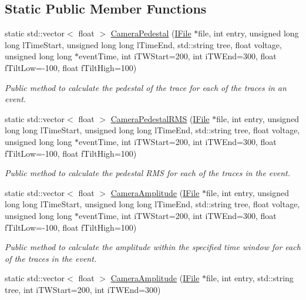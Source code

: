 \subsection*{Static Public Member Functions}
\begin{DoxyCompactItemize}
\item 
static std\+::vector$<$ float $>$ \hyperlink{classIHealthTools_aa6bdf03f0f7595eec0a894c7c73134ea}{Camera\+Pedestal} (\hyperlink{classIFile}{I\+File} $\ast$file, int entry, unsigned long long l\+Time\+Start, unsigned long long l\+Time\+End, std\+::string tree, float voltage, unsigned long long $\ast$event\+Time, int i\+T\+W\+Start=200, int i\+T\+W\+End=300, float f\+Tilt\+Low=-\/100, float f\+Tilt\+High=100)
\begin{DoxyCompactList}\small\item\em Public method to calculate the pedestal of the trace for each of the traces in an event. \end{DoxyCompactList}\item 
static std\+::vector$<$ float $>$ \hyperlink{classIHealthTools_a6adf7b141d8cf397ec7f6abdbd81befd}{Camera\+Pedestal\+R\+MS} (\hyperlink{classIFile}{I\+File} $\ast$file, int entry, unsigned long long l\+Time\+Start, unsigned long long l\+Time\+End, std\+::string tree, float voltage, unsigned long long $\ast$event\+Time, int i\+T\+W\+Start=200, int i\+T\+W\+End=300, float f\+Tilt\+Low=-\/100, float f\+Tilt\+High=100)
\begin{DoxyCompactList}\small\item\em Public method to calculate the pedestal R\+MS for each of the traces in the event. \end{DoxyCompactList}\item 
static std\+::vector$<$ float $>$ \hyperlink{classIHealthTools_a93e06807e441043c9597391754537dc4}{Camera\+Amplitude} (\hyperlink{classIFile}{I\+File} $\ast$file, int entry, unsigned long long l\+Time\+Start, unsigned long long l\+Time\+End, std\+::string tree, float voltage, unsigned long long $\ast$event\+Time, int i\+T\+W\+Start=200, int i\+T\+W\+End=300, float f\+Tilt\+Low=-\/100, float f\+Tilt\+High=100)
\begin{DoxyCompactList}\small\item\em Public method to calculate the amplitude within the specified time window for each of the traces in the event. \end{DoxyCompactList}\item 
static std\+::vector$<$ float $>$ \hyperlink{classIHealthTools_a51f94cdf8490167d3169defc6d214feb}{Camera\+Amplitude} (\hyperlink{classIFile}{I\+File} $\ast$file, int entry, std\+::string tree, int i\+T\+W\+Start=200, int i\+T\+W\+End=300)

\end{DoxyCompactItemize}
